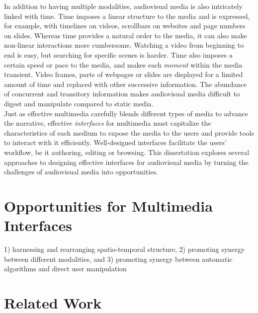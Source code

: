 In addition to having multiple modalities, audiovisual media is also intricately linked with time. Time imposes a linear structure to the media and is expressed, for example, with timelines on videos, scrollbars on websites and page numbers on slides. Whereas time provides a natural order to the media, it can also make non-linear interactions more cumbersome. Watching a video from beginning to end is easy, but searching for specific scenes is harder. Time also imposes a certain speed or pace to the media, and makes each \textit{moment}  within the media transient. Video frames, parts of webpages or slides are displayed for a limited amount of time and replaced with other successive information. The abundance of concurrent and transitory information makes audiovisual media difficult to digest and manipulate compared to static media.\\

Just as effective multimedia carefully blends different types of media to advance the narrative, effective \textit{interfaces} for multimedia must capitalize the characteristics of each medium to expose the media to the users and provide tools to interact with it efficiently. Well-designed interfaces facilitate the users' workflow, be it authoring, editing or browsing. This dissertation explores several approaches to designing effective interfaces for audiovisual media by turning the challenges of audiovisual media into opportunities.

\section{Opportunities for Multimedia Interfaces}
1) harnessing and rearranging spatio-temporal structure, 2) promoting synergy between different modalities, and 3) promoting synergy between automatic algorithms and direct user manipulation

\section{Related Work}